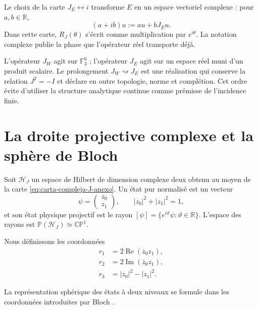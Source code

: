 Le choix de la carte \(J_E\leftrightarrow i\) transforme \(E\) en un
espace vectoriel complexe : pour \(a,b\in\mathbb R\),
\begin{equation}
 (a+ib)u:=au+bJ_Eu.
 \label{eq:carta-compleja-J-anexo}
\end{equation}
Dans cette carte, \(R_J(\theta)\) s'écrit comme multiplication par
\(e^{i\theta}\). La notation complexe publie la phase que l'opérateur réel
transporte déjà.

\begin{remark}
L'opérateur \(J_W\) agit sur \(\mathbb F_3^6\) ; l'opérateur \(J_E\) agit
sur un espace réel muni d'un produit scalaire. Le prolongement
\(J_W\rightsquigarrow J_E\) est une réalisation qui conserve la relation
\(J^2=-I\) et déclare en outre topologie, norme et complétion. Cet ordre évite
d'utiliser la structure analytique continue comme prémisse de l'incidence finie.
\end{remark}

\section{La droite projective complexe et la sphère de Bloch}

Soit \(\mathcal H_J\) un espace de Hilbert de dimension complexe deux obtenu
au moyen de la carte \eqref{eq:carta-compleja-J-anexo}. Un état pur normalisé
est un vecteur
\begin{equation}
 \psi=\begin{pmatrix}z_0\\ z_1\end{pmatrix},
 \qquad |z_0|^2+|z_1|^2=1,
 \label{eq:espinor-normalizado-anexo}
\end{equation}
et son état physique projectif est le rayon
\([\psi]=\{e^{i\vartheta}\psi:\vartheta\in\mathbb R\}\).
L'espace des rayons est \(\mathbb P(\mathcal H_J)\simeq\mathbb{CP}^{1}\).

Nous définissons les coordonnées
\begin{equation}
 \begin{aligned}
 r_1&=2\operatorname{Re}(\overline z_0z_1),\\
 r_2&=2\operatorname{Im}(\overline z_0z_1),\\
 r_3&=|z_0|^2-|z_1|^2.
 \end{aligned}
 \label{eq:coordenadas-bloch-anexo}
\end{equation}

La représentation sphérique des états à deux niveaux se formule dans les
coordonnées introduites par Bloch \cite{Bloch1946}.


